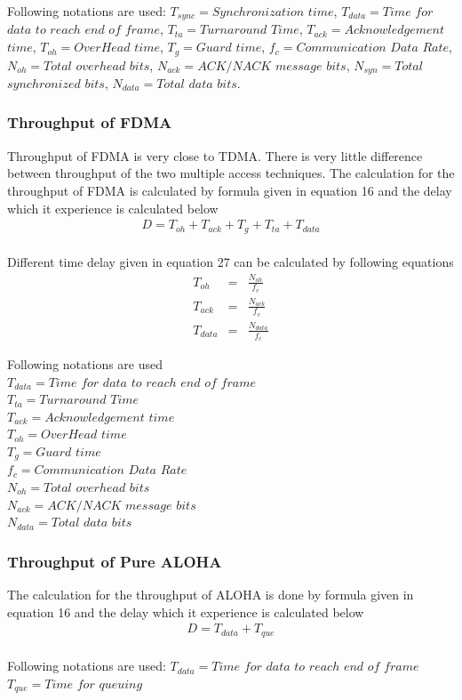 \documentclass[10pt, conference, compsocconf]{IEEEtran}
\begin{document}
Following notations are used: $T_{sync}=Synchronization$ $time$, $T_{data}=Time$ $for$ $data$ $to$ $reach$ $end$ $of$ $frame$, $T_{ta}=Turnaround$ $Time$, $T_{ack}=Acknowledgement$ $time$, $T_{oh}=OverHead$ $time$, $T_{g}=Guard$ $time$, $f_{c}= Communication$ $Data$ $Rate$, $N_{oh}=Total$ $overhead$ $bits$, $N_{ack}=ACK/NACK$ $message$ $bits$, $N_{syn}=Total$ $synchronized$ $bits$, $N_{data}=Total$ $data$ $bits$.
\subsubsection{Throughput of FDMA}
Throughput of FDMA is very close to TDMA. There is very little difference between throughput of the two multiple access techniques. The calculation for the throughput of FDMA is calculated by formula given in equation 16 and the delay which it experience is calculated below
\begin{eqnarray}
D=T_{oh}+T_{ack}+T_{g}+T_{ta}+T_{data}
\end{eqnarray}
\\
Different time delay given in equation 27 can be calculated by following equations
\\
\begin{eqnarray}
T_{oh}&=&\frac{N_{oh}}{f_{c}}
\\
T_{ack}&=&\frac{N_{ack}}{f_{c}}
\\
T_{data}&=&\frac{N_{data}}{f_{c}}
\end{eqnarray}

Following notations are used
\\
$T_{data}=Time$ $for$ $data$ $to$ $reach$ $end$ $of$ $frame$
\\
$T_{ta}=Turnaround$ $Time$
\\
$T_{ack}=Acknowledgement$ $time$
\\
$T_{oh}=OverHead$ $time$
\\
$T_{g}=Guard$ $time$
\\
$f_{c}= Communication$ $Data$ $Rate$
\\
$N_{oh}=Total$ $overhead$ $bits$
\\
$N_{ack}=ACK/NACK$ $message$ $bits$
\\
$N_{data}=Total$ $data$ $bits$
\\
\subsubsection{Throughput of Pure ALOHA}
The calculation for the throughput of ALOHA is done by formula given in equation 16 and the delay which it experience is calculated below
\begin{eqnarray}
D=T_{data} + T_{que}
\end{eqnarray}
\\
Following notations are used: $T_{data}=Time$ $for$ $data$ $to$ $reach$ $end$ $of$ $frame$
\\
$T_{que}=Time$ $for$ $queuing$
\\
\end{document}
